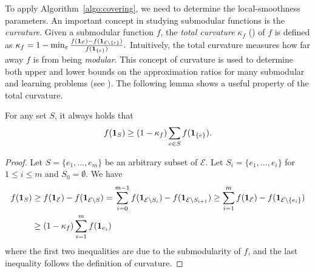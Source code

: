 To apply Algorithm~\ref{algo:covering}, we need to determine the local-smoothness parameters.
An important concept in studying submodular functions is the \emph{curvature}. Given a submodular
function $f$, the \emph{total curvature} $\kappa_{f}$ (\cite{ConfortiCornuejols84:Submodular-set-functions}) of $f$ is defined as
$
\kappa_{f} = 1 - \min_{e} \frac{f(\mathbf{1}_{\mathcal{E}}) - f(\mathbf{1}_{\mathcal{E} \setminus \{e\}})}{f(\mathbf{1}_{\{e\}})}.
$
Intuitively, the total curvature measures how far away $f$ is from being \emph{modular}. This concept of
curvature is used to determine both upper and lower bounds on the approximation ratios
for many submodular and learning problems (see \cite{ConfortiCornuejols84:Submodular-set-functions,GoemansHarvey09:Approximating-submodular,BalcanHarvey12:Learning-Submodular,Vondrak10:Submodularity-and-Curvature:,IyerJegelka13:Curvature-and-optimal,SviridenkoVondrak17:Optimal-approximation}).
The following lemma shows a useful property of the total curvature.

\setcounter{theorem}{7}
\begin{lemma}		\label{lem:curvature}
For any set $S$, it always holds that
$$
f(\mathbf{1}_{S}) \geq (1-\kappa_{f}) \sum_{e \in S} f(\mathbf{1}_{\{e\}}).
$$
\end{lemma}
\begin{proof}
Let $S = \{e_{1}, \ldots, e_{m}\}$ be an
arbitrary subset of $\mathcal{E}$. Let $S_{i} = \{e_{1}, \ldots, e_{i}\}$ for $1 \leq i \leq m$ and $S_{0} = \emptyset$.
We have
\begin{align*}
f(\mathbf{1}_{S})
&\geq  f(\mathbf{1}_{\mathcal{E}}) -  f(\mathbf{1}_{\mathcal{E} \setminus S})
= \sum_{i=0}^{m-1}  f(\mathbf{1}_{\mathcal{E} \setminus S_{i}}) - f(\mathbf{1}_{\mathcal{E} \setminus S_{i+1}})
\geq \sum_{i=1}^{m}  f(\mathbf{1}_{\mathcal{E}}) - f(\mathbf{1}_{\mathcal{E} \setminus \{e_{i}\}}) \\
&\geq (1 - \kappa_{f}) \sum_{i=1}^{m} f(\mathbf{1}_{e_{i}})
\end{align*}
where the first two inequalities are due to the submodularity of $f$, and the last inequality follows the definition of curvature.
\end{proof}

